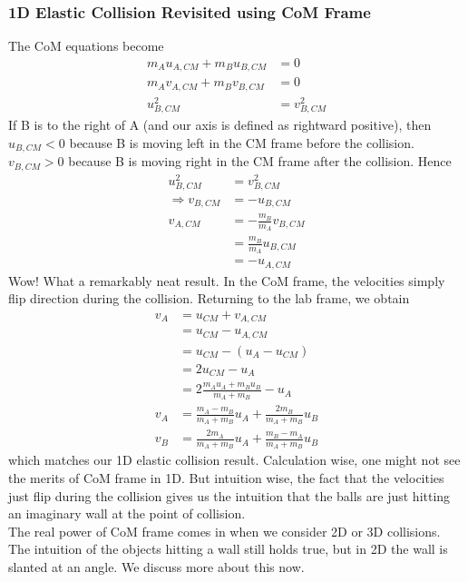 \documentclass{article}
\begin{document}
\subsubsection{1D Elastic Collision Revisited using CoM Frame}
The CoM equations become
\begin{align}
    m_A u_{A,CM} + m_B u_{B,CM} &= 0 \\
    m_A v_{A,CM} + m_B v_{B,CM} &= 0 \\
    u_{B,CM}^2 &= v_{B,CM}^2 
\end{align}
If B is to the right of A (and our axis is defined as rightward positive), then $u_{B,CM} < 0$ because B is moving left in the CM frame before the collision. $v_{B,CM} > 0$ because B is moving right in the CM frame after the collision. Hence 
\begin{align}
    u_{B,CM}^2 &= v_{B,CM}^2 \\
    \Rightarrow v_{B,CM} &= -u_{B,CM} \\
    v_{A,CM} &= -\frac{m_B}{m_A} v_{B,CM} \\ 
    &= \frac{m_B}{m_A} u_{B,CM} \\
    &= - u_{A,CM}
\end{align}
Wow! What a remarkably neat result. In the CoM frame, the velocities simply flip direction during the collision. Returning to the lab frame, we obtain 
\begin{align}
    v_A &= u_{CM} + v_{A,CM} \\
    &= u_{CM} - u_{A,CM} \\
    &= u_{CM} - (u_A - u_{CM}) \\
    &= 2 u_{CM} - u_A \\
    &= 2 \frac{m_A u_A + m_B u_B}{m_A + m_B} - u_A\\
    v_A &= \frac{m_A - m_B}{m_A + m_B} u_A + \frac{2m_B}{m_A + m_B} u_B \\
    v_B &= \frac{2m_A}{m_A + m_B} u_A + \frac{m_B - m_A}{m_A + m_B} u_B
\end{align}
which matches our 1D elastic collision result. Calculation wise, one might not see the merits of CoM frame in 1D. But intuition wise, the fact that the velocities just flip during the collision gives us the intuition that the balls are just hitting an imaginary wall at the point of collision. \\[10pt]

The real power of CoM frame comes in when we consider 2D or 3D collisions. The intuition of the objects hitting a wall still holds true, but in 2D the wall is slanted at an angle. We discuss more about this now.
\end{document}
